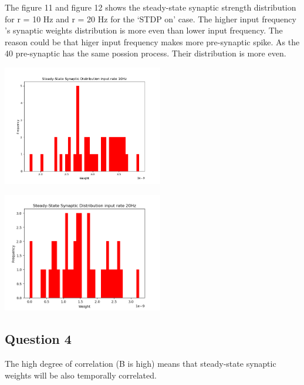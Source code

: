\documentclass[fleqn,11pt]{article}
\begin{document}
\par The figure 11 and figure 12 shows the steady-state synaptic strength distribution for r = 10 Hz and r = 20 Hz for the ‘STDP on’ case.
The higher input frequency 's synaptic weights distribution is more even than lower input frequency.
The reason could be that higer input frequency makes more pre-synaptic spike. As the 40 pre-synaptic has the same possion process.
Their distribution is more even.
\begin{center}
  \begin{minipage}{\linewidth} 
  \begin{minipage}{0.45\linewidth}
    \includegraphics[width=7cm]{graphs/PartB_Question3_10Hz_hism.png}
  \end{minipage}
  \hspace{0.05\linewidth}
  \begin{minipage}{0.45\linewidth}
    \includegraphics[width=7cm]{graphs/PartB_Question3_20Hz_hism.png}
  \end{minipage}
\end{minipage} 
\end{center}

\newpage
\subsection*{Question 4}
\par The high degree of correlation (B is high) means that steady-state synaptic weights will be also temporally correlated.
\end{document}
